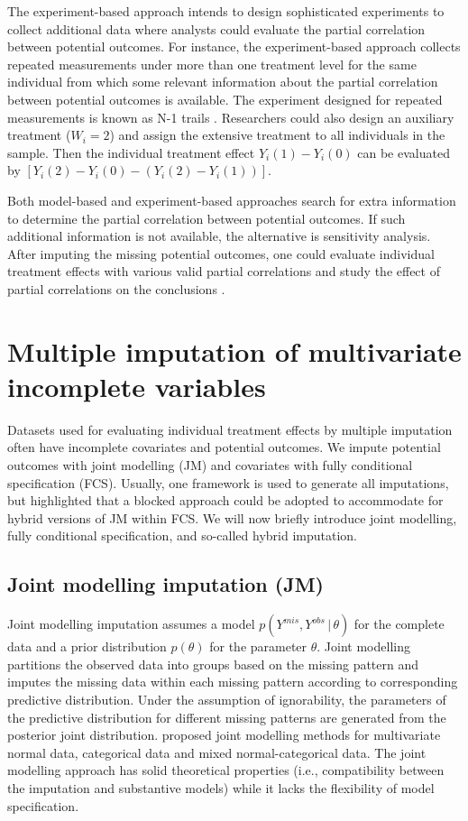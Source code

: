 	The experiment-based approach intends to design sophisticated experiments to collect additional data where analysts could evaluate the partial correlation between potential outcomes. For instance, the experiment-based approach collects repeated measurements under more than one treatment level for the same individual from which some relevant information about the partial correlation between potential outcomes is available. The experiment designed for repeated measurements is known as N-1 trails \citep{shamseer2015consort, araujo2016understanding}. Researchers could also design an auxiliary treatment ($W_{i} = 2$) and assign the extensive treatment to all individuals in the sample. Then the individual treatment effect $Y_{i}(1) - Y_{i}(0)$ can be evaluated by $[Y_{i}(2) - Y_{i}(0) - (Y_{i}(2) - Y_{i}(1))]$. 
	
	Both model-based and experiment-based approaches search for extra information to determine the partial correlation between potential outcomes. If such additional information is not available, the alternative is sensitivity analysis. After imputing the missing potential outcomes, one could evaluate individual treatment effects with various valid partial correlations and study the effect of partial correlations on the conclusions \citep{gadbury2001evaluating}.  
	
	\section{Multiple imputation of multivariate incomplete variables}
	\label{sec:4.3}
	Datasets used for evaluating individual treatment effects by multiple imputation often have incomplete covariates and potential outcomes. We impute potential outcomes with joint modelling (JM) and covariates with fully conditional specification (FCS). Usually, one framework is used to generate all imputations, but \citet{Buuren2018} highlighted that a blocked approach could be adopted to accommodate for hybrid versions of JM within FCS. We will now briefly introduce joint modelling, fully conditional specification, and so-called hybrid imputation. 
	\subsection{Joint modelling imputation (JM)}
	Joint modelling imputation assumes a model $p(Y^{mis}, Y^{obs}\,|\,\theta)$ for the complete data and a prior distribution $p(\theta)$ for the parameter $\theta$. Joint modelling partitions the observed data into groups based on the missing pattern and imputes the missing data within each missing pattern according to corresponding predictive distribution. Under the assumption of ignorability, the parameters of the predictive distribution for different missing patterns are generated from the posterior joint distribution. \citet{schafer1997analysis} proposed joint modelling methods for multivariate normal data, categorical data and mixed normal-categorical data. The joint modelling approach has solid theoretical properties (i.e., compatibility between the imputation and substantive models) while it lacks the flexibility of model specification.
	
